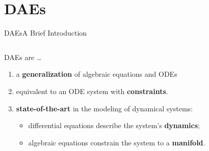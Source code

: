 
\section{\aclp{DAE}}

\begin{frame}{\aclp{DAE}}{A Brief Introduction}
  \begin{columns}
    \begin{column}{0.65\textwidth}
      \acp{DAE} are \dots
      \begin{enumerate}
        \item a \textbf{generalization} of algebraic equations and \acp{ODE} \\
      \end{enumerate}
        \begin{enumerate}\setcounter{enumi}{1}
        \item equivalent to an \ac{ODE} system with \textbf{constraints}.
        \item \textbf{state-of-the-art} in the modeling of dynamical systems:
        \begin{itemize}
          \item differential equations describe the system's \textbf{dynamics};
          \item algebraic equations constrain the system to a \textbf{manifold}.

\end{itemize}
\end{enumerate}
\end{column}
\end{columns}
\end{frame}
